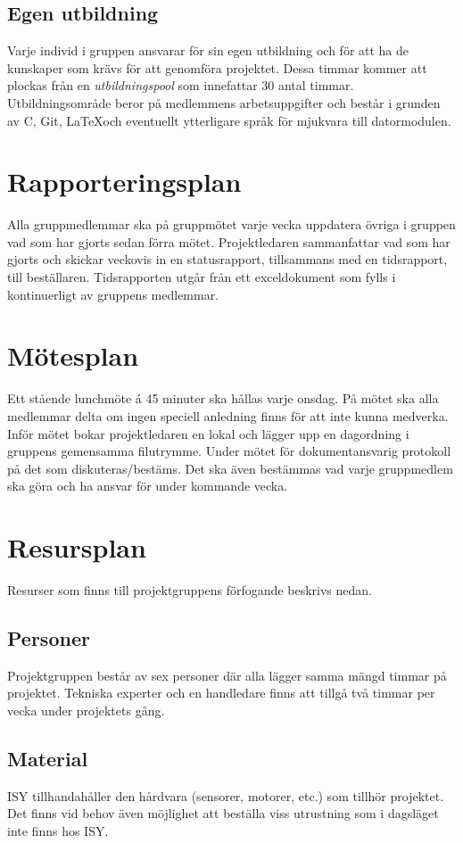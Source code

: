 \documentclass[11pt]{article}
\begin{document}
\begin{flushleft}
\subsection{Egen utbildning}
Varje individ i gruppen ansvarar för sin egen utbildning och för att ha de kunskaper som krävs för att genomföra projektet. Dessa timmar kommer att plockas från en \textit{utbildningspool} som innefattar 30 antal timmar. Utbildningsområde beror på medlemmens arbetsuppgifter och består i grunden av C, Git, \LaTeX och eventuellt ytterligare språk för mjukvara till datormodulen.

\section{Rapporteringsplan}
Alla gruppmedlemmar ska på gruppmötet varje vecka uppdatera övriga i gruppen vad som har gjorts sedan förra mötet. Projektledaren sammanfattar vad som har gjorts och skickar veckovis in en statusrapport, tillsammans med en tidsrapport, till beställaren. Tidsrapporten utgår från ett exceldokument som fylls i kontinuerligt av gruppens medlemmar.

\section{Mötesplan}
Ett stående lunchmöte á 45 minuter ska hållas varje onsdag. På mötet ska alla medlemmar delta om ingen speciell anledning finns för att inte kunna medverka. Inför mötet bokar projektledaren en lokal och lägger upp en dagordning i gruppens gemensamma filutrymme. Under mötet för dokumentansvarig protokoll på det som diskuteras/bestäms. Det ska även bestämmas vad varje gruppmedlem ska göra och ha ansvar för under kommande vecka.

\pagebreak
\section{Resursplan}
Resurser som finns till projektgruppens förfogande beskrivs nedan.
\subsection{Personer}
Projektgruppen består av sex personer där alla lägger samma mängd timmar på projektet. Tekniska experter och en handledare finns att tillgå två timmar per vecka under projektets gång.

\subsection{Material}
ISY tillhandahåller den hårdvara (sensorer, motorer, etc.) som tillhör projektet. Det finns vid behov även möjlighet att beställa viss utrustning som i dagsläget inte finns hos ISY. 


\end{flushleft}
\end{document}
